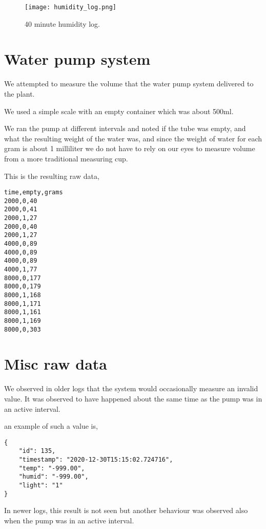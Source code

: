 \documentclass[12pt,a4paper,oneside]{book}
\begin{document}
\begin{figure}[h]
    \begin{center}
        \label{humidity_log}
        \texttt{[image: humidity\_log.png]}
        \caption{40 minute humidity log.}
    \end{center}
\end{figure}

\newpage

\section{Water pump system}

We attempted to measure the volume that the water pump system delivered to the plant.

We used a simple scale with an empty container which was about 500ml.

We ran the pump at different intervals and noted if the tube was empty, and what the resulting weight of the water was, and since the weight of water for each gram is about 1 milliliter we do not have to rely on our eyes to measure volume from a more traditional measuring cup.

This is the resulting raw data,

\begin{verbatim}
time,empty,grams
2000,0,40
2000,0,41
2000,1,27
2000,0,40
2000,1,27
4000,0,89
4000,0,89
4000,0,89
4000,1,77
8000,0,177
8000,0,179
8000,1,168
8000,1,171
8000,1,161
8000,1,169
8000,0,303
\end{verbatim}

\newpage

\section{Misc raw data}
We observed in older logs that the system would occasionally measure an invalid value. It was observed to have happened about the same time as the pump was in an active interval.

an example of such a value is,
\begin{verbatim}
{
    "id": 135,
    "timestamp": "2020-12-30T15:15:02.724716",
    "temp": "-999.00",
    "humid": "-999.00",
    "light": "1"
}
\end{verbatim}

\newpage

In newer logs, this result is not seen but another behaviour was observed also when the pump was in an active interval.
\end{document}
